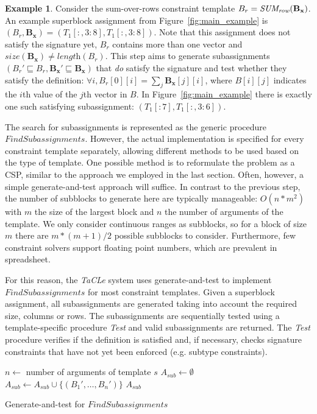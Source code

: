 \documentclass{IEEEtran}
\newcommand{\format}[1]{\textit{#1}\xspace}
\newcommand{\findassignment}{\format{FindSubassignments}}
\newcommand{\sname}{\format{TaCLe}}
\newcommand{\range}[3]{\ensuremath{#1[#2,#3]}}
\newcommand{\rangeto}[2]{#1{:}#2}
\newcommand{\rangeall}{:}
\newcommand{\eccalc}[2]{\ensuremath{#1 = #2}}
\newcommand{\ecsumr}[2]{\eccalc{#1}{\textit{SUM\textsubscript{row}}(#2)}}
\newcommand{\plength}{\format{length}}
\newcommand{\psize}{\format{size}}
\newcommand{\sg}{B}
\theoremstyle{definition}
\newtheorem{example}{Example}
\begin{document}
\begin{example}
  Consider the sum-over-rows constraint template $\ecsumr{\sg_r}{\mathbf{\sg_x}}$.
  An example superblock assignment from Figure~\ref{fig:main_example} is $(B_r, \mathbf{\sg_x}) = (\range{T_1}{\rangeall}{\rangeto{3}{8}}, \range{T_1}{\rangeall}{\rangeto{3}{8}})$.
  Note that this assignment does not satisfy the signature yet, $\sg_r$ contains more than one vector and $\psize(\mathbf{\sg_x}) \neq \plength(B_r)$.
  This step aims to generate subassignments $(B_r' \sqsubseteq B_r, \mathbf{B_x}' \sqsubseteq \mathbf{B_x})$ that \textit{do} satisfy the signature and test whether they satisfy the definition: $\forall i, \sg_r[0][i] = \sum_j \mathbf{\sg_x}[j][i]$, where $B[i][j]$ indicates the $i$th value of the $j$th vector in $B$.
  In Figure~\ref{fig:main_example} there is exactly one such satisfying subassignment: $(T_1[:7], T_1[:,3:6])$.
\end{example}

The search for subassignments is represented as the generic procedure $\findassignment$.
However, the actual implementation is specified for every constraint template separately, allowing different methods to be used based on the type of template.
One possible method is to reformulate the problem as a CSP, similar to the approach we employed in the last section.
Often, however, a simple generate-and-test approach will suffice.
In contrast to the previous step, the number of subblocks to generate here are typically manageable: $O(n*m^2)$ with $m$ the size of the largest block and $n$ the number of arguments of the template.
We only consider continuous ranges as subblocks, so for a block of size $m$ there are $m*(m+1)/2$ possible subblocks to consider.
Furthermore, few constraint solvers support floating point numbers, which are prevalent in spreadsheet.

For this reason, the \sname system uses generate-and-test to implement $\findassignment$ for most constraint templates.
Given a superblock assignment, all subassignments are generated taking into account the required size, columns or rows.
The subassignments are sequentially tested using a template-specific procedure \textit{Test} and valid subassignments are returned.
The \textit{Test} procedure verifies if the definition is satisfied and, if necessary, checks signature constraints that have not yet been enforced (e.g. subtype constraints).

\begin{algorithm}[tbh]
  \begin{algorithmic}
    \footnotesize
    \State $n \gets$ number of arguments of template $s$
    \State $A_{sub} \gets \emptyset$
        \State $A_{sub} \gets A_{sub} \cup \{ (B_1', \dots, B_n') \}$
      \EndIf
    \EndFor
\Return $A_{sub}$
\EndProcedure
\end{algorithmic}
\caption{Generate-and-test for $\findassignment$}
\label{algo:gen-test-subblocks}
\end{algorithm}
\end{document}
